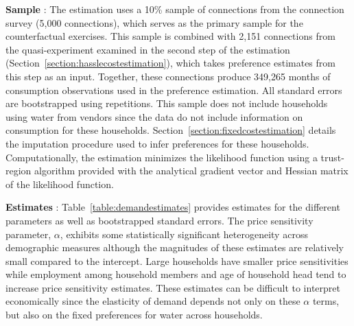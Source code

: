 \documentclass[12pt]{article}
\begin{document}
\textbf{Sample} : The estimation uses a 10\% sample of connections from the connection survey (5,000 connections), which serves as the primary sample for the counterfactual exercises.  This sample is combined with 2,151 connections from the quasi-experiment examined in the second step of the estimation (Section~\ref{section:hasslecostestimation}), which takes preference estimates from this step as an input.  Together, these connections produce 349,265 months of consumption observations used in the preference estimation.  All standard errors are bootstrapped using repetitions.  This sample does not include households using water from vendors since the data do not include information on consumption for these households.  Section~\ref{section:fixedcostestimation} details the imputation procedure used to infer preferences for these households.  Computationally, the estimation minimizes the likelihood function using a trust-region algorithm provided with the analytical gradient vector and Hessian matrix of the likelihood function.

\textbf{Estimates} : Table~\ref{table:demandestimates} provides estimates for the different parameters as well as bootstrapped standard errors.  The price sensitivity parameter, $\alpha$, exhibits some statistically significant heterogeneity across demographic measures although the magnitudes of these estimates are relatively small compared to the intercept. Large households have smaller price sensitivities while employment among household members and age of household head tend to increase price sensitivity estimates.  These estimates can be difficult to interpret economically since the elasticity of demand depends not only on these $\alpha$ terms, but also on the fixed preferences for water across households.
\end{document}
